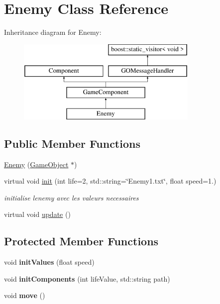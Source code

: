 \hypertarget{class_enemy}{}\section{Enemy Class Reference}
\label{class_enemy}
Inheritance diagram for Enemy\+:\begin{figure}[H]
\begin{center}
\leavevmode
\includegraphics[height=4.000000cm]{class_enemy}
\end{center}
\end{figure}
\subsection*{Public Member Functions}
\begin{DoxyCompactItemize}
\item 
\hyperlink{class_enemy_ae7858f3f39ec6e48b741b7a8eaff6c1d}{Enemy} (\hyperlink{class_game_object}{Game\+Object} $\ast$)
\item 
virtual void \hyperlink{class_enemy_a2966f61498d00e488697a80ef4447ebe}{init} (int life=2, std\+::string=\char`\"{}Enemy1.\+txt\char`\"{}, float speed=1.)
\begin{DoxyCompactList}\small\item\em initialise l\textquotesingle{}enemy avec les valeurs necessaires \end{DoxyCompactList}\item 
virtual void \hyperlink{class_enemy_ad55ee71b5a8c23fbd00b3c368b90cc64}{update} ()
\end{DoxyCompactItemize}
\subsection*{Protected Member Functions}
\begin{DoxyCompactItemize}
\item 
\hypertarget{class_enemy_a304c3d98161d2ebca4ddd8ce1ae974af}{}\label{class_enemy_a304c3d98161d2ebca4ddd8ce1ae974af} 
void {\bfseries init\+Values} (float speed)
\item 
\hypertarget{class_enemy_ae8740856fd04d64259d0bad0eb7ae3ce}{}\label{class_enemy_ae8740856fd04d64259d0bad0eb7ae3ce} 
void {\bfseries init\+Components} (int life\+Value, std\+::string path)
\item 
\hypertarget{class_enemy_a9a398f8d12234f02563b27440aff7891}{}\label{class_enemy_a9a398f8d12234f02563b27440aff7891} 
void {\bfseries move} ()
\end{DoxyCompactItemize}
